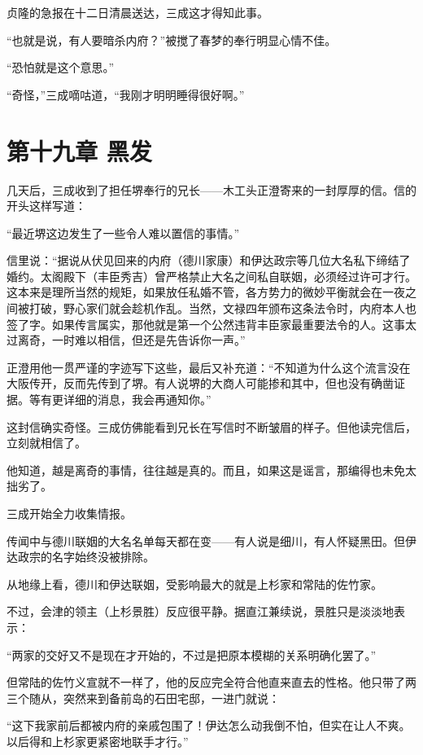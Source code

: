 \documentclass[
]{article}
\begin{document}
贞隆的急报在十二日清晨送达，三成这才得知此事。

``也就是说，有人要暗杀内府？''被搅了春梦的奉行明显心情不佳。

``恐怕就是这个意思。''

``奇怪，''三成嘀咕道，``我刚才明明睡得很好啊。''

\section*{第十九章 黑发}\label{ux7b2cux5341ux4e5dux7ae0-ux9ed1ux53d1}

几天后，三成收到了担任堺奉行的兄长------木工头正澄寄来的一封厚厚的信。信的开头这样写道：

``最近堺这边发生了一些令人难以置信的事情。''

信里说：``据说从伏见回来的内府（德川家康）和伊达政宗等几位大名私下缔结了婚约。太阁殿下（丰臣秀吉）曾严格禁止大名之间私自联姻，必须经过许可才行。这本来是理所当然的规矩，如果放任私婚不管，各方势力的微妙平衡就会在一夜之间被打破，野心家们就会趁机作乱。当然，文禄四年颁布这条法令时，内府本人也签了字。如果传言属实，那他就是第一个公然违背丰臣家最重要法令的人。这事太过离奇，一时难以相信，但还是先告诉你一声。''

正澄用他一贯严谨的字迹写下这些，最后又补充道：``不知道为什么这个流言没在大阪传开，反而先传到了堺。有人说堺的大商人可能掺和其中，但也没有确凿证据。等有更详细的消息，我会再通知你。''

这封信确实奇怪。三成仿佛能看到兄长在写信时不断皱眉的样子。但他读完信后，立刻就相信了。

他知道，越是离奇的事情，往往越是真的。而且，如果这是谣言，那编得也未免太拙劣了。

三成开始全力收集情报。

传闻中与德川联姻的大名名单每天都在变------有人说是细川，有人怀疑黑田。但伊达政宗的名字始终没被排除。

从地缘上看，德川和伊达联姻，受影响最大的就是上杉家和常陆的佐竹家。

不过，会津的领主（上杉景胜）反应很平静。据直江兼续说，景胜只是淡淡地表示：

``两家的交好又不是现在才开始的，不过是把原本模糊的关系明确化罢了。''

但常陆的佐竹义宣就不一样了，他的反应完全符合他直来直去的性格。他只带了两三个随从，突然来到备前岛的石田宅邸，一进门就说：

``这下我家前后都被内府的亲戚包围了！伊达怎么动我倒不怕，但实在让人不爽。以后得和上杉家更紧密地联手才行。''
\end{document}
